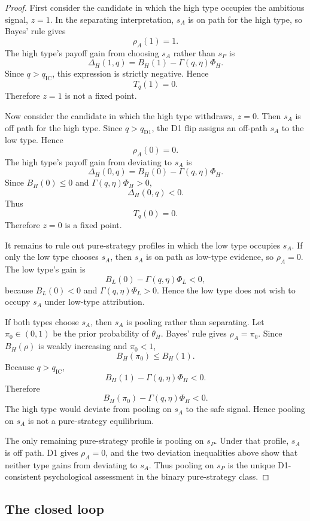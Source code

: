 \begin{proof}
First consider the candidate in which the high type occupies the ambitious signal, \(z=1\). In the separating interpretation, \(s_A\) is on path for the high type, so Bayes' rule gives
\[
\rho_A(1)=1.
\]
The high type's payoff gain from choosing \(s_A\) rather than \(s_P\) is
\[
\Delta_H(1,q)=B_H(1)-\Gamma(q,\eta)\Phi_H.
\]
Since \(q>q_{\mathrm{IC}}\), this expression is strictly negative. Hence
\[
T_q(1)=0.
\]
Therefore \(z=1\) is not a fixed point.

Now consider the candidate in which the high type withdraws, \(z=0\). Then \(s_A\) is off path for the high type. Since \(q>q_{\mathrm{D1}}\), the D1 flip assigns an off-path \(s_A\) to the low type. Hence
\[
\rho_A(0)=0.
\]
The high type's payoff gain from deviating to \(s_A\) is
\[
\Delta_H(0,q)=B_H(0)-\Gamma(q,\eta)\Phi_H.
\]
Since \(B_H(0)\le 0\) and \(\Gamma(q,\eta)\Phi_H>0\),
\[
\Delta_H(0,q)<0.
\]
Thus
\[
T_q(0)=0.
\]
Therefore \(z=0\) is a fixed point.

It remains to rule out pure-strategy profiles in which the low type occupies \(s_A\). If only the low type chooses \(s_A\), then \(s_A\) is on path as low-type evidence, so \(\rho_A=0\). The low type's gain is
\[
B_L(0)-\Gamma(q,\eta)\Phi_L<0,
\]
because \(B_L(0)<0\) and \(\Gamma(q,\eta)\Phi_L>0\). Hence the low type does not wish to occupy \(s_A\) under low-type attribution.

If both types choose \(s_A\), then \(s_A\) is pooling rather than separating. Let \(\pi_0\in(0,1)\) be the prior probability of \(\theta_H\). Bayes' rule gives \(\rho_A=\pi_0\). Since \(B_H(\rho)\) is weakly increasing and \(\pi_0<1\),
\[
B_H(\pi_0)\le B_H(1).
\]
Because \(q>q_{\mathrm{IC}}\),
\[
B_H(1)-\Gamma(q,\eta)\Phi_H<0.
\]
Therefore
\[
B_H(\pi_0)-\Gamma(q,\eta)\Phi_H<0.
\]
The high type would deviate from pooling on \(s_A\) to the safe signal. Hence pooling on \(s_A\) is not a pure-strategy equilibrium.

The only remaining pure-strategy profile is pooling on \(s_P\). Under that profile, \(s_A\) is off path. D1 gives \(\rho_A=0\), and the two deviation inequalities above show that neither type gains from deviating to \(s_A\). Thus pooling on \(s_P\) is the unique D1-consistent psychological assessment in the binary pure-strategy class.
\end{proof}

\subsection{The closed loop}
\label{subsec:closed-loop}


